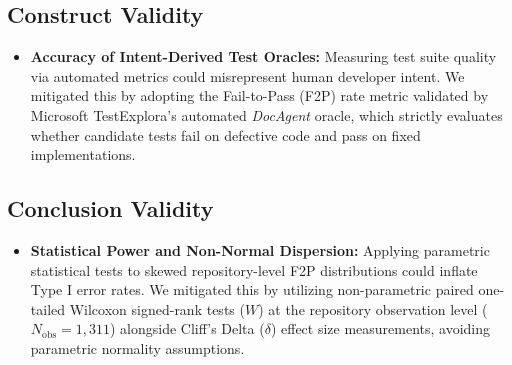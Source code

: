 \subsection{Construct Validity}
\begin{itemize}
    \item \textbf{Accuracy of Intent-Derived Test Oracles:} Measuring test suite quality via automated metrics could misrepresent human developer intent. We mitigated this by adopting the Fail-to-Pass (F2P) rate metric validated by Microsoft TestExplora's automated \textit{DocAgent} oracle, which strictly evaluates whether candidate tests fail on defective code and pass on fixed implementations.
\end{itemize}

\subsection{Conclusion Validity}
\begin{itemize}
    \item \textbf{Statistical Power and Non-Normal Dispersion:} Applying parametric statistical tests to skewed repository-level F2P distributions could inflate Type I error rates. We mitigated this by utilizing non-parametric paired one-tailed Wilcoxon signed-rank tests ($W$) at the repository observation level ($N_{\text{obs}} = 1,311$) alongside Cliff's Delta ($\delta$) effect size measurements, avoiding parametric normality assumptions.
\end{itemize}

